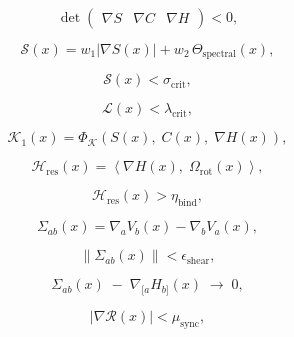 \[
\det\!\begin{pmatrix}
\nabla S & \nabla C & \nabla H
\end{pmatrix} < 0,
\]

\[
\mathcal{S}(x) = 
w_1 \left| \nabla S(x) \right|
+ 
w_2\,\Theta_{\mathrm{spectral}}(x),
\]

\[
\mathcal{S}(x) < \sigma_{\mathrm{crit}},
\]

\[
\mathcal{L}(x) < \lambda_{\mathrm{crit}},
\]

\[
\mathcal{K}_{1}(x) = 
\Phi_{\mathcal{K}}\!\left(
S(x),\;
C(x),\;
\nabla H(x)
\right),
\]

\[
\mathcal{H}_{\mathrm{res}}(x) =
\left\langle
\nabla H(x),\;
\Omega_{\mathrm{rot}}(x)
\right\rangle,
\]

\[
\mathcal{H}_{\mathrm{res}}(x) > \eta_{\mathrm{bind}},
\]

\[
\Sigma_{ab}(x) =
\nabla_a V_b(x) - \nabla_b V_a(x),
\]

\[
\left\| \Sigma_{ab}(x) \right\|
< \epsilon_{\mathrm{shear}},
\]

\[
\Sigma_{ab}(x) \;-\; \nabla_{[a} H_{b]}(x) \;\rightarrow\; 0,
\]

\[
\left|
\nabla \mathcal{R}(x)
\right|
< 
\mu_{\mathrm{sync}},
\]

